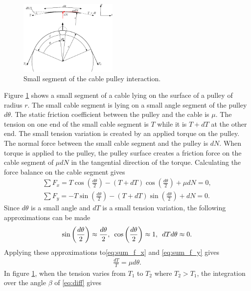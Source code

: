 \begin{figure}
    \centering
    \includegraphics[width = 0.43\textwidth]{capstan_equation.eps}
    \caption{Small segment of the cable pulley interaction.}
    \label{fig:friction_fig}
\end{figure}
\par
Figure \ref{fig:friction_fig} shows a small  segment of a cable lying on the surface of a pulley of radius $r$. The small cable segment is lying on a small angle segment of the pulley $d\theta$. The static friction coefficient between the pulley and the cable is $\mu$. The tension on one end of the small cable segment is $T$ while it is $T+dT$ at the other end. The small tension variation is created by an applied torque on the pulley. The normal force between the small cable segment and the pulley  is $dN$. When torque is applied to the pulley, the pulley surface creates a friction force on the cable segment of $\mu dN$ in the tangential direction of the torque. Calculating the force balance on the cable segment gives 
\begin{align}
    \sum F_x = T\cos\left(\frac{d\theta}{2}\right) - (T+dT)\cos\left(\frac{d\theta}{2}\right) + \mu dN =0,\label{eq:sum_f_x}\\
    \sum F_y = -T\sin\left(\frac{d\theta}{2}\right)-(T+dT)\sin\left(\frac{d\theta}{2}\right)+dN = 0.\label{eq:sum_f_y}
\end{align}
Since $d\theta$ is a small angle and $dT$ is a small tension variation, the following approximations can be made
\begin{align}
    \sin\left(\frac{d\theta}{2}\right)\approx \frac{d\theta}{2},\hspace{0.5em} \cos\left(\frac{d\theta}{2}\right)\approx 1,\hspace{0.5em} dTd\theta \approx 0. 
\end{align}
Applying these approximations to\eqref{eq:sum_f_x} and \eqref{eq:sum_f_y} gives
\begin{align}
    \frac{dT}{T} = \mu d\theta. \label{eq:diff}
\end{align}
In figure \ref{fig:friction_fig}, when the tension varies from $T_1$ to $T_2$ where $T_2>T_1$, the integration over the angle $\beta$ of \eqref{eq:diff} gives

